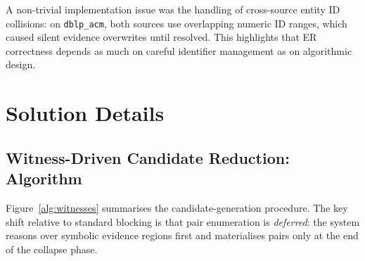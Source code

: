 \documentclass[10pt,twocolumn]{article}
\begin{document}
A non-trivial implementation issue was the handling of cross-source entity ID
collisions: on \texttt{dblp\_acm}, both sources use overlapping numeric ID
ranges, which caused silent evidence overwrites until resolved. This
highlights that ER correctness depends as much on careful identifier
management as on algorithmic design.

\section{Solution Details}

\subsection{Witness-Driven Candidate Reduction: Algorithm}

Figure~\ref{alg:witnesses} summarises the candidate-generation procedure.
The key shift relative to standard blocking is that pair enumeration is
\emph{deferred}: the system reasons over symbolic evidence regions first and
materialises pairs only at the end of the collapse phase.
\end{document}
